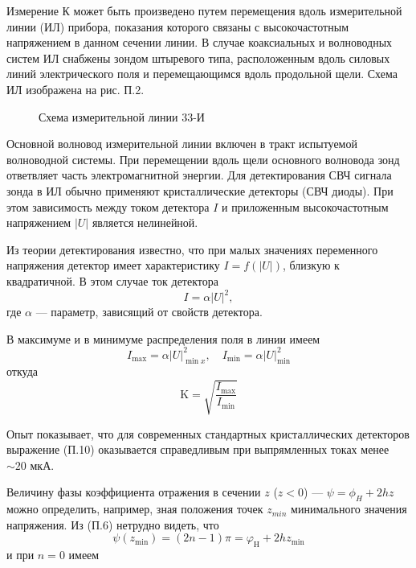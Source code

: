 Измерение К может быть произведено путем перемещения вдоль измерительной линии (ИЛ) прибора, показания которого связаны с высокочастотным напряжением в данном сечении линии. 
В случае коаксиальных и волноводных систем ИЛ снабжены зондом штыревого типа, расположенным вдоль силовых линий электрического поля и перемещающимся вдоль продольной щели. 
Схема ИЛ изображена на рис. П.2.
\begin{figure}[h!]
	\centering
	\caption{Схема измерительной линии 33-И}
	\label{fig:figure1}
\end{figure}

Основной волновод измерительной линии включен в тракт испытуемой волноводной системы. 
При перемещении вдоль щели основного волновода зонд ответвляет часть электромагнитной энергии. 
Для детектирования СВЧ сигнала зонда в ИЛ обычно применяют кристаллические детекторы (СВЧ диоды). 
При этом зависимость между током детектора $I$ и приложенным высокочастотным напряжением $|U|$ является нелинейной.

Из теории детектирования известно, что при малых значениях переменного напряжения детектор имеет характеристику $I=f(|U|)$, близкую к квадратичной. В этом случае ток детектора
\begin{equation}
	I=\alpha|U|^2,
\end{equation}
где $\alpha$ --- параметр, зависящий от свойств детектора.

В максимуме и в минимуме распределения поля в линии имеем
\begin{equation}
	I _ { \max } = \alpha | U | _ { \min x } ^ { 2 } , \quad I _ { \min } = \alpha | U | _ { \min } ^ { 2 }
\end{equation}
откуда
\begin{equation}
	\mathrm { K } = \sqrt { \frac { I _ { \mathrm { max } } } { I _ { \mathrm { min } } } }
\end{equation}

Опыт показывает, что для современных стандартных кристаллических детекторов выражение (П.10) оказывается справедливым при выпрямленных токах менее $\sim20$ мкА.

Величину фазы коэффициента отражения в сечении $z$ ($z<0$) --- $\psi=\phi_H+2hz$ можно определить, например, зная положения точек $z_{min}$ минимального значения напряжения. Из (П.6) нетрудно видеть, что
\begin{equation}
	\psi \left( z _ { \min } \right) = ( 2 n - 1 ) \pi = \varphi _ { \mathrm { H } } + 2 h z _ { \min }
\end{equation}
и при $n = 0$ имеем

